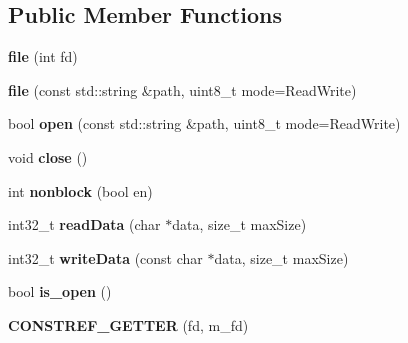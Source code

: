 \subsection*{Public Member Functions}
\begin{DoxyCompactItemize}
\item 
{\bfseries file} (int fd)\hypertarget{classgxx_1_1io_1_1file_a0c15bddbbdc9ae42222340b520518f52}{}\label{classgxx_1_1io_1_1file_a0c15bddbbdc9ae42222340b520518f52}

\item 
{\bfseries file} (const std\+::string \&path, uint8\+\_\+t mode=Read\+Write)\hypertarget{classgxx_1_1io_1_1file_a593f0de63d9bff88c4dc53d1f0e296ee}{}\label{classgxx_1_1io_1_1file_a593f0de63d9bff88c4dc53d1f0e296ee}

\item 
bool {\bfseries open} (const std\+::string \&path, uint8\+\_\+t mode=Read\+Write)\hypertarget{classgxx_1_1io_1_1file_a0e5d1c616e3b7d33b2350879b491007d}{}\label{classgxx_1_1io_1_1file_a0e5d1c616e3b7d33b2350879b491007d}

\item 
void {\bfseries close} ()\hypertarget{classgxx_1_1io_1_1file_a02ad63d35237ec7b2e98d46c6ba68430}{}\label{classgxx_1_1io_1_1file_a02ad63d35237ec7b2e98d46c6ba68430}

\item 
int {\bfseries nonblock} (bool en)\hypertarget{classgxx_1_1io_1_1file_af3a6e0e06cd4cd8ac3b286e4a0c8b8b6}{}\label{classgxx_1_1io_1_1file_af3a6e0e06cd4cd8ac3b286e4a0c8b8b6}

\item 
int32\+\_\+t {\bfseries read\+Data} (char $\ast$data, size\+\_\+t max\+Size)\hypertarget{classgxx_1_1io_1_1file_af79a1e44cbdc65d8db55f50c5bcd280f}{}\label{classgxx_1_1io_1_1file_af79a1e44cbdc65d8db55f50c5bcd280f}

\item 
int32\+\_\+t {\bfseries write\+Data} (const char $\ast$data, size\+\_\+t max\+Size)\hypertarget{classgxx_1_1io_1_1file_a20d67cc30af4d410f5a2a7445922a429}{}\label{classgxx_1_1io_1_1file_a20d67cc30af4d410f5a2a7445922a429}

\item 
bool {\bfseries is\+\_\+open} ()\hypertarget{classgxx_1_1io_1_1file_a32fa2ef5c3693ce04ac8202b7f6a1bf9}{}\label{classgxx_1_1io_1_1file_a32fa2ef5c3693ce04ac8202b7f6a1bf9}

\item 
{\bfseries C\+O\+N\+S\+T\+R\+E\+F\+\_\+\+G\+E\+T\+T\+ER} (fd, m\+\_\+fd)\hypertarget{classgxx_1_1io_1_1file_a91857983f549b9e0dc1379a5bd054293}{}\label{classgxx_1_1io_1_1file_a91857983f549b9e0dc1379a5bd054293}

\end{DoxyCompactItemize}
